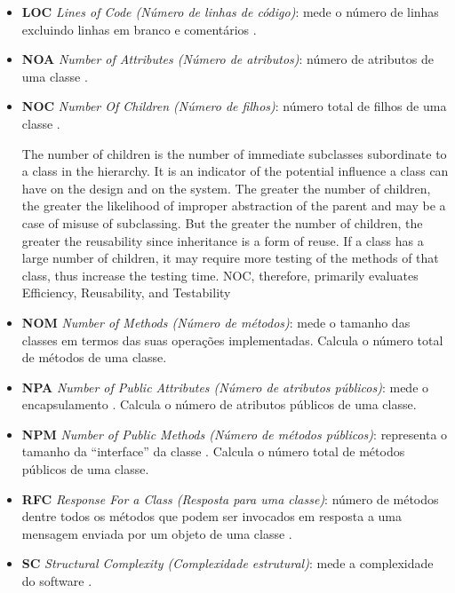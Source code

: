 \begin{itemize}
  \item {\bf LOC} {\it Lines of Code (Número de linhas de código)}: mede o
    número de linhas excluindo linhas em branco e comentários
    \cite{Lorenz1994}.

  \item {\bf NOA} {\it Number of Attributes (Número de atributos)}: número de
    atributos de uma classe \cite{Kolewe1993}.

  \item {\bf NOC} {\it Number Of Children (Número de filhos)}: número total de
    filhos de uma classe \cite{Rosenberg1997}.

The number of children is the number of immediate subclasses subordinate to a class in
the hierarchy. It is an indicator of the potential influence a class can have on the design
and on the system. The greater the number of children, the greater the likelihood of
improper abstraction of the parent and may be a case of misuse of subclassing. But the
greater the number of children, the greater the reusability since inheritance is a form of
reuse. If a class has a large number of children, it may require more testing of the
methods of that class, thus increase the testing time. NOC, therefore, primarily
evaluates Efficiency, Reusability, and Testability

  \item {\bf NOM} {\it Number of Methods (Número de métodos)}: mede o tamanho
    das classes em termos das suas operações implementadas. Calcula o número
    total de métodos de uma classe.

  \item {\bf NPA} {\it Number of Public Attributes (Número de atributos
    públicos)}: mede o encapsulamento \cite{Jagdish1997}. Calcula o número
    de atributos públicos de uma classe.

  \item {\bf NPM} {\it Number of Public Methods (Número de métodos públicos)}:
    representa o tamanho da ``interface'' da classe \cite{Jagdish1997}. Calcula
    o número total de métodos públicos de uma classe.

  \item {\bf RFC} {\it Response For a Class (Resposta para uma classe)}:
    número de métodos dentre todos os métodos que podem ser invocados em
    resposta a uma mensagem enviada por um objeto de uma classe
    \cite{Sharble1993}.

  \item {\bf SC} {\it Structural Complexity (Complexidade estrutural)}: mede a
    complexidade do software \cite{Darcy2005}.


\end{itemize}
